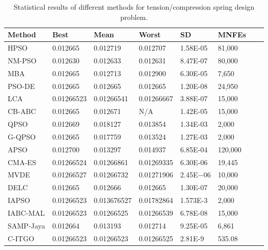 
\begin{table*}[tp]
    \tiny
\begin{center}

\begin{tabular}{ P{2.0cm} P{2.0cm} P{2.0cm} P{2.0cm} P{2.0cm} P{2.0cm} P{2.0cm} P{2.0cm}  }
\hline
\textbf{Method} & \textbf{Best} & \textbf{Mean} & \textbf{Worst} & \textbf{SD} & \textbf{MNFEs} \\
\hline

HPSO & 0.012665 & 0.012719 & 0.012707 & 1.58E-05 & 81,000 \\
NM-PSO & 0.012630 & 0.012633 & 0.012631 & 8.47E-07 & 80,000 \\
MBA & 0.012665 & 0.012713 & 0.012900 & 6.30E-05 & 7,650 \\
PSO-DE & 0.012665 & 0.012665 & 0.012665 & 1.20E-08 & 24,950 \\
LCA & 0.01266523 & 0.01266541 & 0.01266667 & 3.88E-07 & 15,000 \\
CB-ABC & 0.012665 & 0.012671 & N/A & 1.42E-05 & 15,000 \\
QPSO & 0.012669 & 0.018127 & 0.013854 & 1.34E-03 & 2,000 \\
G-QPSO & 0.012665 & 0.017759 & 0.013524 & 1.27E-03 & 2,000 \\
APSO & 0.012700 & 0.013297 & 0.014937 & 6.85E-04 & 120,000 \\
CMA-ES & 0.01266524 & 0.01266861 & 0.01269335 & 6.30E-06 & 19,445 \\
MVDE & 0.01266527 & 0.01266732 & 0.01271906 & 2.45E−06 & 10,000 \\
DELC & 0.012665 & 0.012666 & 0.012665 & 1.30E-07 & 20,000 \\
IAPSO & 0.01266523 & 0.013676527 & 0.01782864 & 1.573E-3 & 2,000 \\
IABC-MAL & 0.01266523 & 0.01266525 & 0.01266539 & 6.78E-08 & 15,000 \\
SAMP-Jaya & 0.012664 & 0.013193 & 0.012714 & 9.25E-05 & 6,861 \\
C-ITGO & 0.01266523 & 0.01266523 & 0.01266525 & 2.81E-9 & 535.08 \\

\hline
\end{tabular}
\end{center}

\caption{ Statistical results of different methods for tension/compression spring design problem. \\[1em]}
\label{tab:TC}
\end{table*}

